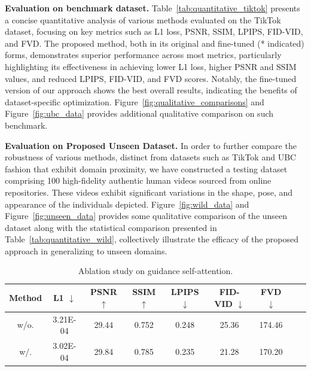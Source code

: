 \textbf{Evaluation on benchmark dataset.}
Table~\ref{tab:quantitative_tiktok} presents a concise quantitative analysis of various methods evaluated on the TikTok dataset, focusing on key metrics such as L1 loss, PSNR, SSIM, LPIPS, FID-VID, and FVD. 
The proposed method, both in its original and fine-tuned (* indicated) forms, demonstrates superior performance across most metrics, particularly highlighting its effectiveness in achieving lower L1 loss, higher PSNR and SSIM values, and reduced LPIPS, FID-VID, and FVD scores. 
Notably, the fine-tuned version of our approach shows the best overall results, indicating the benefits of dataset-specific optimization. 
Figure~\ref{fig:qualitative_comparisons} and Figure~\ref{fig:ubc_data} provides additional qualitative comparison on such benchmark.

\textbf{Evaluation on Proposed Unseen Dataset.}
In order to further compare the robustness of various methods, distinct from datasets such as TikTok and UBC fashion that exhibit domain proximity, we have constructed a testing dataset comprising 100 high-fidelity authentic human videos sourced from online repositories.
These videos exhibit significant variations in the shape, pose, and appearance of the individuals depicted.
Figure~\ref{fig:wild_data} and Figure~\ref{fig:unseen_data} provides some qualitative comparison of the unseen dataset along with the statistical comparison presented in Table~\ref{tab:quantitative_wild}, collectively illustrate the efficacy of the proposed approach in generalizing to unseen domains.


\begin{table}[!t]
\centering
\begin{tabular}{c|cccc|cccc}
\hline
Method          & L1 $\downarrow$ & PSNR $\uparrow$ & SSIM $\uparrow$ & LPIPS $\downarrow$ &  FID-VID $\downarrow$ & FVD $\downarrow$ \\ \hline
w/o.  & 3.21E-04        & 29.44           & 0.752           & 0.248                      & 25.36                & 174.46           \\
w/.  & 3.02E-04           & 29.84             & 0.785            & 0.235                              & 21.28                  & 170.20             \\\hline
\end{tabular} 
\vspace{1mm}
\caption{Ablation study on guidance self-attention.}
\vspace{-4mm}
\label{tab:guidance_attention}
\end{table}

